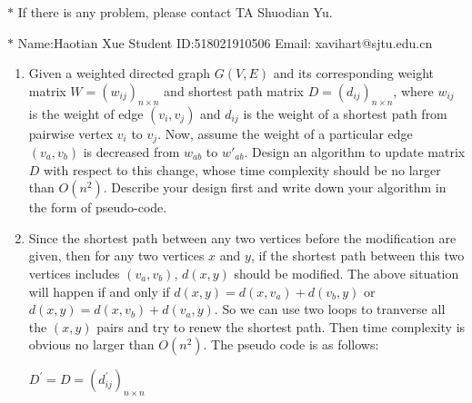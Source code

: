 \documentclass[12pt,a4paper]{article}
\makeatletter
\newtheorem*{solution}{Solution}
\theoremstyle{definition}
\renewenvironment{solution}[1][Solution] {\par\pushQED{\qed}\normalfont\topsep6\p@\@plus6\p@\relax\trivlist\item[\hskip\labelsep\bfseries#1\@addpunct{.}]\ignorespaces}{\popQED\endtrivlist\@endpefalse} \makeatother
\makeatother
\begin{document}
\noindent

\noindent{}
\begin{center}
\footnotesize{\color{red}$*$ If there is any problem, please contact TA Shuodian Yu. }

\footnotesize{\color{blue}$*$ Name:Haotian Xue  \quad Student ID:518021910506 \quad Email: xavihart@sjtu.edu.cn}
\end{center}
\begin{enumerate}
\item Given a weighted directed graph $G(V, E)$ and its corresponding weight matrix $W=(w_{ij})_{n \times n}$ and shortest path matrix $D=(d_{ij})_{n \times n}$, where $w_{ij}$ is the weight of edge $(v_i, v_j)$ and $d_{ij}$ is the weight of a shortest path from pairwise vertex $v_i$ to $v_j$. Now, assume the weight of a particular edge $(v_a, v_b)$ is decreased from $w_{ab}$ to $w'_{ab}$. Design an algorithm to update matrix $D$ with respect to this change, whose time complexity should be no larger than $O(n^2)$. Describe your design first and write down your algorithm in the form of pseudo-code.
    \begin{solution}
		Since the shortest path between any two vertices before the modification are given, then for any two vertices $x$ and $y$, if the shortest path between this two vertices includes $(v_a, v_b)$, $d(x, y)$ should be modified.
	The above situation will happen if and only if $d(x, y) = d(x, v_a) + d(v_b, y)$ or $d(x, y) = d(x, v_b) + d(v_a, y)$. So we can use two loops to tranverse all the $(x, y)$ pairs and try to renew the shortest path.
	Then time complexity is obvious no larger than $O(n^2)$. The pseudo code is as follows:
	
	\begin{minipage}[t]{0.90\textwidth}
		\begin{algorithm}[H]
			
			$D^{'} = D = (d^{'}_{ij})_{n\times n}$

	
	
\end{algorithm}
\end{minipage}
\end{solution}
\end{enumerate}
\end{document}
